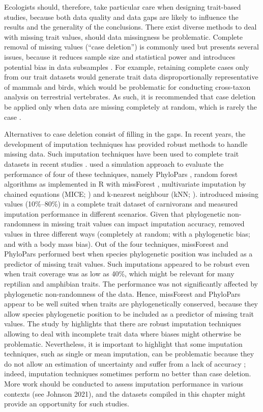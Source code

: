 Ecologists should, therefore, take particular care when designing trait-based studies, because both data quality and data gaps are likely to influence the results and the generality of the conclusions. There exist diverse methods to deal with missing trait values, should data missingness be problematic. Complete removal of missing values (“case deletion”) is commonly used but presents several issues, because it reduces sample size and statistical power and introduces potential bias in data subsamples \citep{Nakagawa2008}. For example, retaining complete cases only from our trait datasets would generate trait data disproportionally representative of mammals and birds, which would be problematic for conducting cross-taxon analysis on terrestrial vertebrates. As such, it is recommended that case deletion be applied only when data are missing completely at random, which is rarely the case \citep{Peugh2004}.

Alternatives to case deletion consist of filling in the gaps. In recent years, the development of imputation techniques has provided robust methods to handle missing data. Such imputation techniques have been used to complete trait datasets in recent studies \citep{Cooke2019b}. \citet{Penone2014} used a simulation approach to evaluate the performance of four of these techniques, namely PhyloPars \citep{Bruggeman2009}, random forest algorithms as implemented in R with missForest \citep{Stekhoven2016, Stekhoven2012}, multivariate imputation by chained equations (MICE; \citet{micepackage}) and k-nearest neighbour (kNN; \citet{Troyanskaya2001}). \citet{Penone2014} introduced missing values (10\%–80\%) in a complete trait dataset of carnivorans and measured imputation performance in different scenarios. Given that phylogenetic non-randomness in missing trait values can impact imputation accuracy, \citet{Penone2014} removed values in three different ways (completely at random; with a phylogenetic bias; and with a body mass bias). Out of the four techniques, missForest and PhyloPars performed best when species phylogenetic position was included as a predictor of missing trait values. Such imputations appeared to be robust even when trait coverage was as low as 40\%, which might be relevant for many reptilian and amphibian traits. The performance was not significantly affected by phylogenetic non-randomness of the data. Hence, missForest and PhyloPars appear to be well suited when traits are phylogenetically conserved, because they allow species phylogenetic position to be included as a predictor of missing trait values. The study by \citet{Penone2014} highlights that there are robust imputation techniques allowing to deal with incomplete trait data where biases might otherwise be problematic. Nevertheless, it is important to highlight that some imputation techniques, such as single or mean imputation, can be problematic because they do not allow an estimation of uncertainty and suffer from a lack of accuracy \citep{Nakagawa2008}; indeed, imputation techniques sometimes perform no better than case deletion. More work should be conducted to assess imputation performance in various contexts (see Johnson 2021), and the datasets compiled in this chapter might provide an opportunity for such studies.

